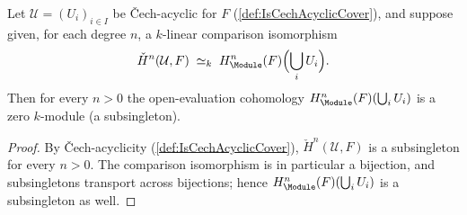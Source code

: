 \begin{lemma}
  \label{lem:subsingleton_HModule_supr_of_cechAcyclic}

  Let \(\mathcal U = (U_i)_{i \in I}\) be \v{C}ech-acyclic for \(F\) (\cref{def:IsCechAcyclicCover}), and suppose given, for each degree \(n\), a \(k\)-linear comparison isomorphism
  \[
    \check H^n(\mathcal U, F) \;\simeq_k\; H^n_{\Module}(F)\Bigl(\bigcup_{i} U_i\Bigr).
  \]
  Then for every \(n > 0\) the open-evaluation cohomology \(H^n_{\Module}(F)(\bigcup_i U_i)\) is a zero \(k\)-module (a subsingleton).
\end{lemma}

\begin{proof}

  By \v{C}ech-acyclicity (\cref{def:IsCechAcyclicCover}), \(\check H^n(\mathcal U, F)\) is a subsingleton for every \(n > 0\). The comparison isomorphism is in particular a bijection, and subsingletons transport across bijections; hence \(H^n_{\Module}(F)(\bigcup_i U_i)\) is a subsingleton as well.
\end{proof}
